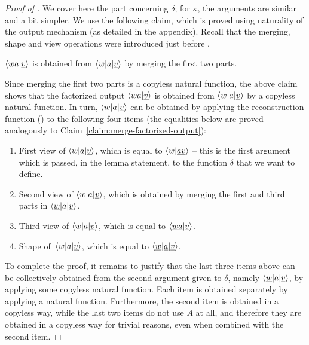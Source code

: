 \begin{proof}[Proof of ]
  We cover here the part concerning $\delta$; for $\kappa$, the arguments are
  similar and a bit simpler. We use the following claim, which is proved using
  naturality of the output mechanism (as detailed in the appendix). Recall that
  the merging, shape and view operations were introduced just before
  .
    \begin{claim}\label{claim:merge-factorized-output}
        $\langle wa|\underline v \rangle$ is obtained from $\langle w|a|\underline v \rangle$ by merging the first two parts.
    \end{claim}

    Since merging the first two parts is a copyless natural function,  the above
    claim shows that  the factorized output $\langle wa|\underline v \rangle$ is
    obtained from $\langle w|a|\underline v \rangle$ by a copyless natural function.
    In turn, $\langle w|a|\underline v \rangle$ can be obtained by applying the reconstruction function () to the following four items (the equalities below are proved analogously to Claim~\ref{claim:merge-factorized-output}):
     \begin{enumerate}
        \item \label{it:first-view}First view of $\langle w|a|\underline v \rangle$, which is equal to $\langle w|\underline {av} \rangle$ -- this is the first argument which is passed, in the lemma statement, to the function $\delta$ that we want to define.
        \item  \label{it:second-view} Second view of $\langle w|a|\underline v \rangle$, which is obtained by merging the first and third parts in $\langle \underline w|a|\underline v \rangle$.
        \item \label{it:third-view}   Third view of $\langle w|a|\underline v \rangle$, which is equal to $\langle \underline {wa}|\underline{v} \rangle$.
        \item   \label{it:shape} Shape of~$\langle w|a|\underline v \rangle$, which is equal to $\langle \underline w|\underline a| \underline v \rangle$.
     \end{enumerate}

To complete the proof, it remains to justify that the last three items above can
be collectively obtained from the second argument given to $\delta$, namely $\langle \underline w|a|\underline v \rangle$, by applying some copyless natural function. Each item is obtained separately by applying a natural function. Furthermore, the second item is obtained in a copyless way, while the last two items do not use $A$ at all, and therefore they are obtained in a copyless way for trivial reasons, even when combined with the second item.
\end{proof}


